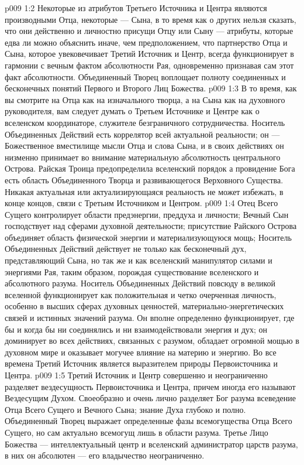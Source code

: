 \vs p009 1:2 Некоторые из атрибутов Третьего Источника и Центра являются производными Отца, некоторые --- Сына, в то время как о других нельзя сказать, что они действенно и личностно присущи Отцу или Сыну --- атрибуты, которые едва ли можно объяснить иначе, чем предположением, что партнерство Отца и Сына, которое увековечивает Третий Источник и Центр, всегда функционирует в гармонии с вечным фактом абсолютности Рая, одновременно признавая сам этот факт абсолютности. Объединенный Творец воплощает полноту соединенных и бесконечных понятий Первого и Второго Лиц Божества.
\vs p009 1:3 \pc В то время, как вы смотрите на Отца как на изначального творца, а на Сына как на духовного руководителя, вам следует думать о Третьем Источнике и Центре как о вселенском координаторе, служителе безграничного сотрудничества. Носитель Объединенных Действий есть коррелятор всей актуальной реальности; он --- Божественное вместилище мысли Отца и слова Сына, и в своих действиях он низменно принимает во внимание материальную абсолютность центрального Острова. Райская Троица предопределила вселенский порядок  а провидение Бога есть область Объединенного Творца и развивающегося Верховного Существа. Никакая актуальная или актуализирующаяся реальность не может избежать, в конце концов, связи с Третьим Источником и Центром.
\vs p009 1:4 \pc Отец Всего Сущего контролирует области предэнергии, преддуха и личности; Вечный Сын господствует над сферами духовной деятельности; присутствие Райского Острова объединяет область физической энергии и материализующуюся мощь; Носитель Объединенных Действий действует не только как бесконечный дух, представляющий Сына, но так же и как вселенский манипулятор силами и энергиями Рая, таким образом, порождая существование вселенского и абсолютного разума. Носитель Объединенных Действий повсюду в великой вселенной функционирует как положительная и четко очерченная личность, особенно в высших сферах духовных ценностей, материально\hyp{}энергетических связей и истинных значений разума. Он вполне определенно функционирует, где бы и когда бы ни соединялись и ни взаимодействовали энергия и дух; он доминирует во всех действиях, связанных с разумом, обладает огромной мощью в духовном мире и оказывает могучее влияние на материю и энергию. Во все времена Третий Источник является выразителем природы Первоисточника и Центра.
\vs p009 1:5 \pc Третий Источник и Центр совершенно и неограниченно разделяет вездесущность Первоисточника и Центра, причем иногда его называют Вездесущим Духом. Своеобразно и очень лично разделяет Бог разума всеведение Отца Всего Сущего и Вечного Сына; знание Духа глубоко и полно. Объединенный Творец выражает определенные фазы всемогущества Отца Всего Сущего, но сам актуально всемогущ лишь в области разума. Третье Лицо Божества --- интеллектуальный центр и вселенский администратор царств разума, в них он абсолютен --- его владычество неограниченно.
